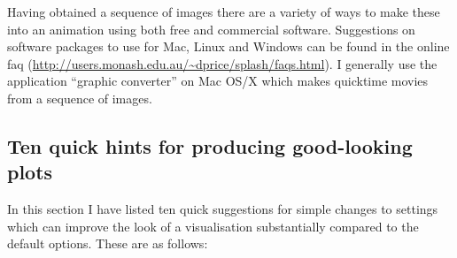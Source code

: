 \documentclass[a4paper,10pt]{article}
\begin{document}
 Having obtained a sequence of images there are a variety of ways to make these into an animation using both free and commercial software. Suggestions on software packages to use for Mac, Linux and Windows can be found in the online faq (\url{http://users.monash.edu.au/~dprice/splash/faqs.html}). I generally use the application ``graphic converter'' on Mac OS/X which makes quicktime movies from a sequence of images.
 
 
\subsection{Ten quick hints for producing good-looking plots}
In this section I have listed ten quick suggestions for simple changes to settings which can improve the look of a visualisation substantially compared to the default options. These are as follows:
\end{document}
